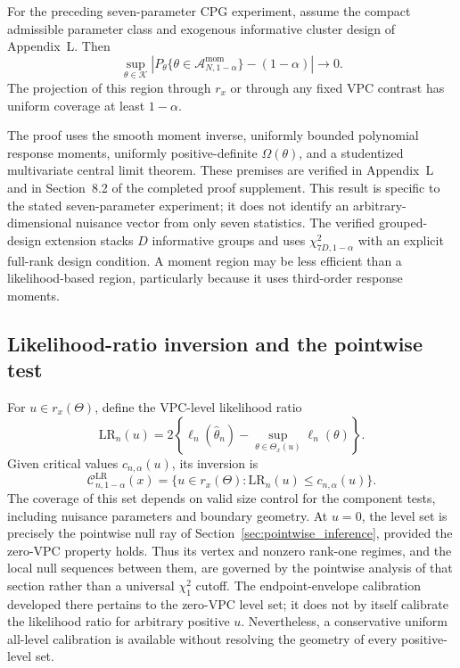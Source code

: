 \begin{theorem}
\label{thm:sec8-cpg-moment}
For the preceding seven-parameter CPG experiment, assume the
compact admissible parameter class and exogenous informative
cluster design of Appendix~L. Then
\begin{equation}\label{eq:sec8-cpg-uniform}
\sup_{\theta\in\mathcal K}
\left|P_\theta\{\theta\in
\mathcal A_{N,1-\alpha}^{\mathrm{mom}}\}
-(1-\alpha)\right|\longrightarrow0.
\end{equation}
The projection of this region through $r_x$ or through any
fixed VPC contrast has uniform coverage at least $1-\alpha$.
\end{theorem}

The proof uses the smooth moment inverse, uniformly bounded
polynomial response moments, uniformly positive-definite
$\Omega(\theta)$, and a studentized multivariate central limit
theorem. These premises are verified in Appendix~L and in
Section~8.2 of the completed proof supplement.
This result is specific to the stated seven-parameter experiment;
it does not identify an arbitrary-dimensional nuisance vector from
only seven statistics. The verified grouped-design extension stacks
$D$ informative groups and uses $\chi^2_{7D,1-\alpha}$ with an
explicit full-rank design condition. A moment region may be less
efficient than a likelihood-based region, particularly because it
uses third-order response moments.

\subsection{Likelihood-ratio inversion and the pointwise test}
\label{subsec:ci-lr-inversion}

For $u\in r_x(\Theta)$, define the VPC-level likelihood ratio
\begin{equation}\label{eq:sec8-profile}
\mathrm{LR}_n(u)=2\left\{
\ell_n(\widehat\theta_n)-
\sup_{\theta\in\Theta_x(u)}\ell_n(\theta)
\right\}.
\end{equation}
Given critical values $c_{n,\alpha}(u)$, its inversion is
\begin{equation}\label{eq:sec8-inversion}
\mathcal C_{n,1-\alpha}^{\mathrm{LR}}(x)
=\{u\in r_x(\Theta):
\mathrm{LR}_n(u)\le c_{n,\alpha}(u)\}.
\end{equation}
The coverage of this set depends on valid size control for the
component tests, including nuisance parameters and boundary geometry.
At $u=0$, the level set is precisely the pointwise null ray of
Section~\ref{sec:pointwise_inference}, provided the zero-VPC
property holds. Thus its vertex and nonzero rank-one regimes, and the
local null sequences between them, are governed by the pointwise
analysis of that section rather than a universal $\chi_1^2$ cutoff.
The endpoint-envelope calibration developed there pertains to the
zero-VPC level set; it does not by itself calibrate the likelihood
ratio for arbitrary positive $u$. Nevertheless, a conservative
uniform all-level calibration is available without resolving the
geometry of every positive-level set.

